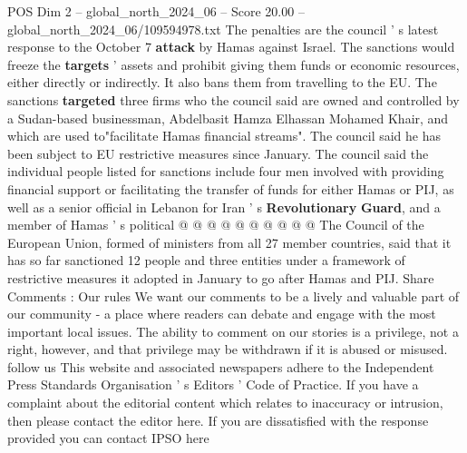 \begin{textsample}{POS Dim 2 – global\_north\_2024\_06 – Score 20.00 – global\_north\_2024\_06/109594978.txt}
The penalties are the council ' s latest response to the October 7 \textbf{attack} by Hamas against Israel.
The sanctions would freeze the \textbf{targets} ' assets and prohibit giving them funds or economic resources, either directly or indirectly.
It also bans them from travelling to the EU.
The sanctions \textbf{targeted} three firms who the council said are owned and controlled by a Sudan-based businessman, Abdelbasit Hamza Elhassan Mohamed Khair, and which are used to"facilitate Hamas financial streams".
The council said he has been subject to EU restrictive measures since January.
The council said the individual people listed for sanctions include four men involved with providing financial support or facilitating the transfer of funds for either Hamas or PIJ, as well as a senior official in Lebanon for Iran ' s \textbf{Revolutionary} \textbf{Guard}, and a member of Hamas ' s political @ @ @ @ @ @ @ @ @ @ The Council of the European Union, formed of ministers from all 27 member countries, said that it has so far sanctioned 12 people and three entities under a framework of restrictive measures it adopted in January to go after Hamas and PIJ.
Share Comments : Our rules We want our comments to be a lively and valuable part of our community - a place where readers can debate and engage with the most important local issues.
The ability to comment on our stories is a privilege, not a right, however, and that privilege may be withdrawn if it is abused or misused. follow us This website and associated newspapers adhere to the Independent Press Standards Organisation ' s Editors ' Code of Practice.
If you have a complaint about the editorial content which relates to inaccuracy or intrusion, then please contact the editor here.
If you are dissatisfied with the response provided you can contact IPSO here

\end{textsample}
